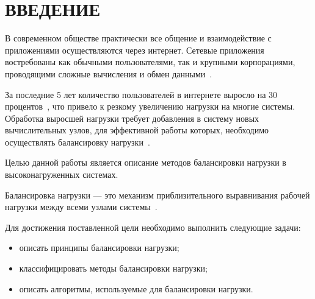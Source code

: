 \chapter*{ВВЕДЕНИЕ}

В современном обществе практически все общение и взаимодействие с приложениями осуществляются через интернет. Сетевые приложения востребованы как обычными пользователями, так и крупными корпорациями, проводящими сложные вычисления и обмен данными~\cite{webact}.

За последние 5 лет количество пользователей в интернете выросло на 30 процентов~\cite{statistics}, что привело к резкому увеличению нагрузки на многие системы. Обработка выросшей нагрузки требует добавления в систему новых вычислительных узлов, для эффективной работы которых, необходимо осуществлять балансировку нагрузки~\cite{strategies, com_analysis, gaud, part_algos}.

Целью данной работы является описание методов балансировки нагрузки в высоконагруженных системах.

Балансировка нагрузки --- это механизм приблизительного выравнивания рабочей нагрузки между всеми узлами системы~\cite{anal}.

Для достижения поставленной цели необходимо выполнить следующие
задачи:
\begin{itemize}
	\item описать принципы балансировки нагрузки;
	\item классифицировать методы балансировки нагрузки;
	\item описать алгоритмы, используемые для балансировки нагрузки.
\end{itemize}

